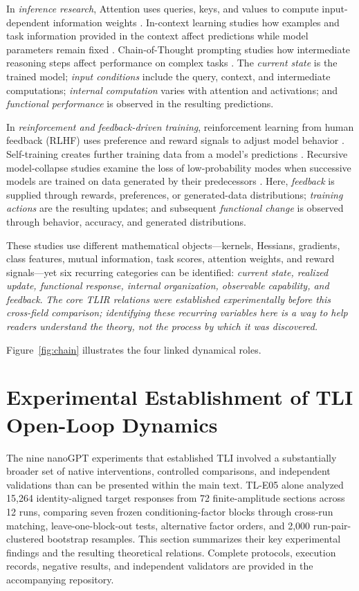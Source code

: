 \documentclass[12pt,letterpaper]{article}
\begin{document}
In \emph{inference research}, Attention uses queries, keys, and values to compute input-dependent information weights \cite{vaswani2017}. In-context learning studies how examples and task information provided in the context affect predictions while model parameters remain fixed \cite{brown2020}. Chain-of-Thought prompting studies how intermediate reasoning steps affect performance on complex tasks \cite{wei2022}. The \emph{current state} is the trained model; \emph{input conditions} include the query, context, and intermediate computations; \emph{internal computation} varies with attention and activations; and \emph{functional performance} is observed in the resulting predictions.

In \emph{reinforcement and feedback-driven training}, reinforcement learning from human feedback (RLHF) uses preference and reward signals to adjust model behavior \cite{ouyang2022}. Self-training creates further training data from a model's predictions \cite{xie2020}. Recursive model-collapse studies examine the loss of low-probability modes when successive models are trained on data generated by their predecessors \cite{shumailov2024}. Here, \emph{feedback} is supplied through rewards, preferences, or generated-data distributions; \emph{training actions} are the resulting updates; and subsequent \emph{functional change} is observed through behavior, accuracy, and generated distributions.

These studies use different mathematical objects---kernels, Hessians, gradients, class features, mutual information, task scores, attention weights, and reward signals---yet six recurring categories can be identified: \emph{current state, realized update, functional response, internal organization, observable capability, and feedback}. \emph{The core TLIR relations were established experimentally before this cross-field comparison; identifying these recurring variables here is a way to help readers understand the theory, not the process by which it was discovered.}

Figure~\ref{fig:chain} illustrates the four linked dynamical roles.





\section{Experimental Establishment of TLI Open-Loop Dynamics}
The nine nanoGPT experiments that established TLI involved a substantially broader set of native interventions, controlled comparisons, and independent validations than can be presented within the main text. TL-E05 alone analyzed 15,264 identity-aligned target responses from 72 finite-amplitude sections across 12 runs, comparing seven frozen conditioning-factor blocks through cross-run matching, leave-one-block-out tests, alternative factor orders, and 2,000 run-pair-clustered bootstrap resamples. This section summarizes their key experimental findings and the resulting theoretical relations. Complete protocols, execution records, negative results, and independent validators are provided in the accompanying repository.
\end{document}
